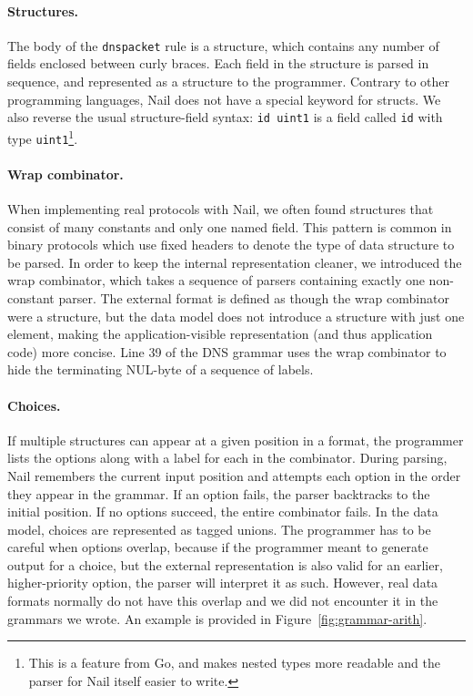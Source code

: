 \paragraph{Structures.}

The body of the \texttt{dnspacket} rule is a structure, which contains any number of fields enclosed
between  curly braces. Each field in the structure is parsed in sequence, and represented as a
structure to the programmer.  Contrary to other programming languages, Nail does not have a special
keyword for structs. We also reverse the usual structure-field syntax: \texttt{id uint1} is a field
called \texttt{id} with type \texttt{uint1}\footnote{This is a feature from Go, and makes nested
  types more readable and the parser for Nail itself easier to write.}.


\paragraph{Wrap combinator.} 
When implementing real protocols with Nail, we often found
structures that consist of many constants and only one named field. This pattern is
common in binary protocols which use fixed headers to denote the type of data
structure to be parsed.  In order to keep the internal representation cleaner,
we introduced the wrap combinator, which takes a sequence of parsers containing
exactly one non-constant parser. The external format is defined as though the wrap combinator were a
structure, but the data model does not introduce a structure with just one element, making the application-visible representation
(and thus application code) more concise.
Line 39 of the DNS grammar uses the wrap combinator to hide the terminating NUL-byte of a sequence
of labels.


\paragraph{Choices.}
If multiple structures can appear at a given position in a format, the programmer lists the options
along with a label for each in the  combinator. 
During parsing, Nail remembers the current input position and attempts each option in the order they
appear in the grammar. If an option fails, the parser backtracks to the initial position. If no
options succeed, the entire combinator fails. In the data model, choices are represented as tagged
unions.  The programmer has to be careful when options overlap, because if the programmer meant to
generate output for a choice, but the external representation is also valid for an earlier,
higher-priority option, the parser will interpret it as such. However, real data formats normally do
not have this overlap and we did not encounter it in the grammars we wrote.
An example is provided in Figure~\ref{fig:grammar-arith}.

